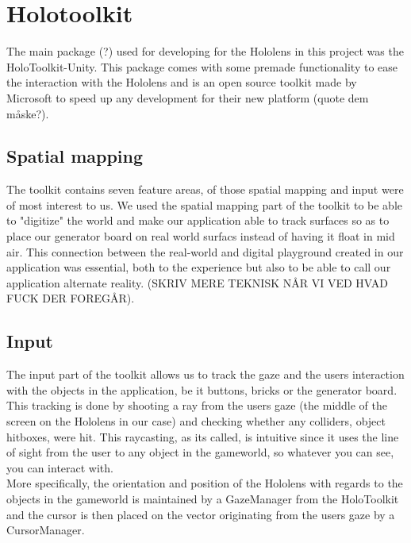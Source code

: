 
\section{Holotoolkit}
The main package (?) used for developing for the Hololens in this project was the HoloToolkit-Unity. This package comes with some premade functionality to ease the interaction with the Hololens and is an open source toolkit made by Microsoft to speed up any development for their new platform (quote dem måske?).

\subsection{Spatial mapping}
The toolkit contains seven feature areas, of those spatial mapping and input were of most interest to us. We used the spatial mapping part of the toolkit to be able to "digitize" the world and make our application able to track surfaces so as to place our generator board on real world surfacs instead of having it float in mid air. This connection between the real-world and digital playground created in our application was essential, both to the experience but also to be able to call our application alternate reality. (SKRIV MERE TEKNISK NÅR VI VED HVAD FUCK DER FOREGÅR).

\subsection{Input}
The input part of the toolkit allows us to track the gaze and the users interaction with the objects in the application, be it buttons, bricks or the generator board. This tracking is done by shooting a ray from the users gaze (the middle of the screen on the Hololens in our case) and checking whether any colliders, object hitboxes, were hit. This raycasting, as its called, is intuitive since it uses the line of sight from the user to any object in the gameworld, so whatever you can see, you can interact with.\\
More specifically, the orientation and position of the Hololens with regards to the objects in the gameworld is maintained by a GazeManager from the HoloToolkit and the cursor is then placed on the vector originating from the users gaze by a CursorManager. 